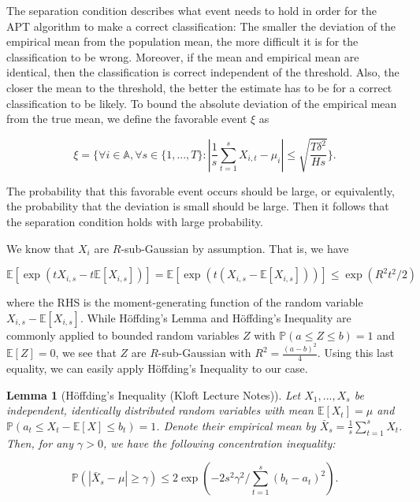 \documentclass[11pt,]{article}
\newtheorem{lemma}{Lemma}
\begin{document}
The separation condition describes what event needs to hold in order for
the APT algorithm to make a correct classification: The smaller the
deviation of the empirical mean from the population mean, the more
difficult it is for the classification to be wrong. Moreover, if the
mean and empirical mean are identical, then the classification is
correct independent of the threshold. Also, the closer the mean to the
threshold, the better the estimate has to be for a correct
classification to be likely. To bound the absolute deviation of the
empirical mean from the true mean, we define the favorable event \(\xi\)
as

\[
\xi = \Big\{\forall i \in \mathbb{A}, \forall s \in \{1,...,T\} : |\frac{1}{s} \sum_{t=1}^{s}X_{i,t} - \mu_i| \leq \sqrt{\frac{T \delta^2}{H s}} \Big\}.
\]

The probability that this favorable event occurs should be large, or
equivalently, the probability that the deviation is small should be
large. Then it follows that the separation condition holds with large
probability.

We know that \(X_i\) are \(R\)-sub-Gaussian by assumption. That is, we
have

\[
\mathbb{E}[\exp (tX_{i,s}-t\mathbb{E}[X_{i,s}])] = \mathbb{E}[\exp (t(X_{i,s}-\mathbb{E}[X_{i,s}]))] \leq \exp (R^2t^2/2)
\]

where the RHS is the moment-generating function of the random variable
\(X_{i,s}-\mathbb{E}[X_{i,s}]\). While Höffding's Lemma and Höffding's
Inequality are commonly applied to bounded random variables \(Z\) with
\(\mathbb{P}(a\leq Z \leq b) = 1\) and \(\mathbb{E}[Z] = 0\), we see
that \(Z\) are \(R\)-sub-Gaussian with \(R^2 = \frac{(a-b)^2}{4}\).
Using this last equality, we can easily apply Höffding's Inequality to
our case.

\begin{lemma}[Höffding's Inequality (Kloft Lecture Notes)] \label{lemma:HoeffdingsInequality}
Let $X_1, ..., X_s$ be independent, identically distributed random variables with mean $\mathbb{E}[X_t] = \mu$ and $\mathbb{P}(a_t \leq X_t - \mathbb{E}[X] \leq b_t) = 1$. Denote their empirical mean by $\bar{X}_s=\frac{1}{s}\sum_{t=1}^{s}X_t$. Then, for any $\gamma > 0$, we have the following concentration inequality:

\begin{equation*}
\mathbb{P}(|\bar{X}_s - \mu| \geq \gamma) \leq 2\exp (-2s^2\gamma^2/\sum_{t=1}^s(b_t - a_t)^2).
\end{equation*}
\end{lemma}
\end{document}
